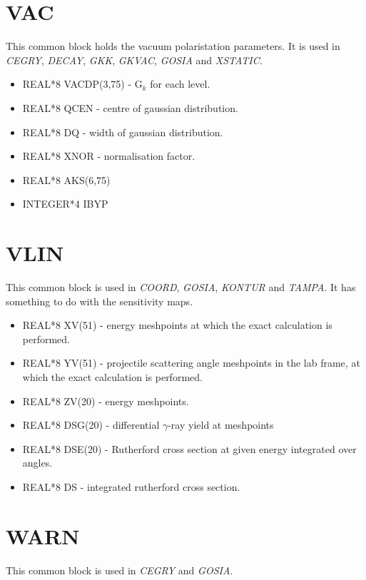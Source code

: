 \section{VAC}

This common block holds the vacuum polaristation parameters. It is used in
{\em CEGRY}, {\em DECAY}, {\em GKK}, {\em GKVAC}, {\em GOSIA} and {\em
XSTATIC}.

\begin{itemize}
\item REAL*8 VACDP(3,75) - G$_k$ for each level.
\item REAL*8 QCEN - centre of gaussian distribution.
\item REAL*8 DQ - width of gaussian distribution.
\item REAL*8 XNOR - normalisation factor.
\item REAL*8 AKS(6,75)
\item INTEGER*4 IBYP
\end{itemize}

\section{VLIN}

This common block is used in {\em COORD}, {\em GOSIA}, {\em KONTUR} and {\em
TAMPA}. It has something to do with the sensitivity maps.

\begin{itemize}
\item REAL*8 XV(51) - energy meshpoints at which the exact calculation is
performed.
\item REAL*8 YV(51) - projectile scattering angle meshpoints in the lab
frame, at which the exact calculation is performed.
\item REAL*8 ZV(20) - energy meshpoints.
\item REAL*8 DSG(20) - differential $\gamma$-ray yield at meshpoints
\item REAL*8 DSE(20) - Rutherford cross section at given energy integrated
over angles.
\item REAL*8 DS - integrated rutherford cross section.
\end{itemize}

\section{WARN}

This common block is used in {\em CEGRY} and {\em GOSIA}.

